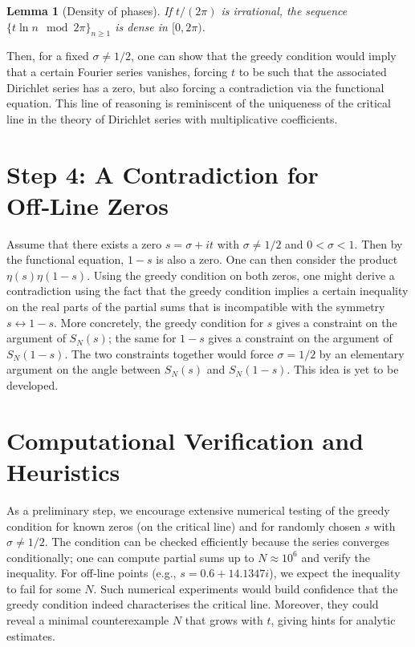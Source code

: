\documentclass[12pt,a4paper]{article}
\newtheorem{lemma}[theorem]{Lemma}
\begin{document}
\begin{lemma}[Density of phases]
If $t/(2\pi)$ is irrational, the sequence $\{t\ln n \mod 2\pi\}_{n\ge1}$ is dense in $[0,2\pi)$.
\end{lemma}

Then, for a fixed $\sigma\neq1/2$, one can show that the greedy condition would imply that a certain Fourier series vanishes, forcing $t$ to be such that the associated Dirichlet series has a zero, but also forcing a contradiction via the functional equation. This line of reasoning is reminiscent of the uniqueness of the critical line in the theory of Dirichlet series with multiplicative coefficients.

\section{Step 4: A Contradiction for Off‑Line Zeros}

Assume that there exists a zero $s=\sigma+it$ with $\sigma\neq1/2$ and $0<\sigma<1$. Then by the functional equation, $1-s$ is also a zero. One can then consider the product $\eta(s)\eta(1-s)$. Using the greedy condition on both zeros, one might derive a contradiction using the fact that the greedy condition implies a certain inequality on the real parts of the partial sums that is incompatible with the symmetry $s\leftrightarrow 1-s$. More concretely, the greedy condition for $s$ gives a constraint on the argument of $S_N(s)$; the same for $1-s$ gives a constraint on the argument of $S_N(1-s)$. The two constraints together would force $\sigma=1/2$ by an elementary argument on the angle between $S_N(s)$ and $S_N(1-s)$. This idea is yet to be developed.

\section{Computational Verification and Heuristics}

As a preliminary step, we encourage extensive numerical testing of the greedy condition for known zeros (on the critical line) and for randomly chosen $s$ with $\sigma\neq1/2$. The condition can be checked efficiently because the series converges conditionally; one can compute partial sums up to $N\approx 10^6$ and verify the inequality. For off‑line points (e.g., $s=0.6+14.1347i$), we expect the inequality to fail for some $N$. Such numerical experiments would build confidence that the greedy condition indeed characterises the critical line. Moreover, they could reveal a minimal counterexample $N$ that grows with $t$, giving hints for analytic estimates.
\end{document}
